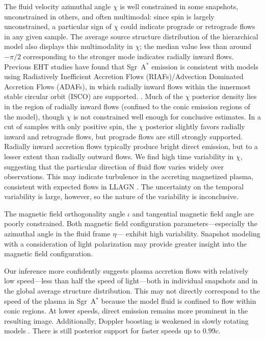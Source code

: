 \documentclass[linenumbers, twocolumn, tighten]{aastex701}
\def\sgra{Sgr~A$^*$\xspace}
\begin{document}
The fluid velocity azimuthal angle $\chi$ is well constrained in some snapshots, unconstrained in others, and often multimodal: since spin is largely unconstrained, a particular sign of $\chi$ could indicate prograde or retrograde flows in any given sample. The average source structure distribution of the hierarchical model also displays this multimodality in $\chi$; the median value less than around $-\pi /2$ corresponding to the stronger mode indicates radially inward flows. Previous EHT studies have found that \sgra emission is consistent with models using Radiatively Inefficient Accretion Flows (RIAFs)/Advection Dominated Accretion Flows (ADAFs), in which radially inward flows within the innermost stable circular orbit (ISCO) are supported. \citep[]{2018ApJ...863..148P}. Much of the $\chi$ posterior density lies in the region of radially inward flows (confined to the conic emission regions of the model), though $\chi$ is not constrained well enough for conclusive estimates. In a cut of samples with only positive spin, the $\chi$ posterior slightly favors radially inward and retrograde flows, but prograde flows are still strongly supported. Radially inward accretion flows typically produce bright direct emission, but to a lesser extent than radially outward flows. We find high time variability in $\chi$, suggesting that the particular direction of fluid flow varies widely over observations. This may indicate turbulence in the accreting magnetized plasma, consistent with expected flows in LLAGN . The uncertainty on the temporal variability is large, however, so the nature of the variability is inconclusive.

The magnetic field orthogonality angle $\iota$ and tangential magnetic field angle are poorly constrained. Both magnetic field configuration parameters---especially the azimuthal angle in the fluid frame $\eta$--- exhibit high variability. Snapshot modeling with a consideration of light polarization may provide greater insight into the magnetic field configuration.

Our inference more confidently suggests plasma accretion flows with relatively low speed---less than half the speed of light---both in individual snapshots and in the global average structure distribution. This may not directly correspond to the speed of the plasma in \sgra because the model fluid is confined to flow within conic regions. At lower speeds, direct emission remains more prominent in the resulting image. Additionally, Doppler boosting is weakened in slowly rotating models . There is still posterior support for faster speeds up to $0.99c$.
\end{document}
